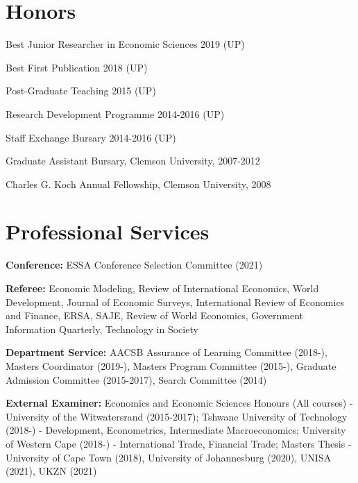 \documentclass[margin,line]{res}                          %
\newenvironment{list1}{
  \begin{list}{\ding{113}}{%
      \setlength{\itemsep}{0.4em}
      \setlength{\parsep}{0in} \setlength{\parskip}{0in}
      \setlength{\topsep}{0in} \setlength{\partopsep}{0in} 
      \setlength{\leftmargin}{0.17in}}}{\end{list}}
\begin{document}
\begin{resume}
\section{\sc Honors}
\begin{list1}
\item[] Best Junior Researcher in Economic Sciences 2019 (UP)
\item[] Best First Publication 2018 (UP)
\item[] Post-Graduate Teaching 2015 (UP)
\item[] Research Development Programme 2014-2016 (UP)
\item[] Staff Exchange Bursary 2014-2016 (UP)
\item[] Graduate Assistant Bursary, Clemson University, 2007-2012
\item[] Charles G. Koch Annual Fellowship, Clemson University, 2008
\end{list1}

\section{\sc Professional Services}
\begin{list1}
\item[] \textbf{Conference: } ESSA Conference Selection Committee (2021)
\item[] \textbf{Referee: }Economic Modeling, Review of International Economics, World Development, Journal of Economic Surveys, International Review of Economics and Finance, ERSA, SAJE, Review of World Economics, Government Information Quarterly, Technology in Society 
\item[] \textbf{Department Service: }AACSB Assurance of Learning Committee (2018-), Masters Coordinator (2019-), Masters Program Committee (2015-), Graduate Admission Committee (2015-2017), Search Committee (2014) 
\item[] \textbf{External Examiner: }Economics and Economic Sciences Honours (All courses) - University of the Witwatersrand (2015-2017); Tshwane University of Technology (2018-) - Development, Econometrics, Intermediate Macroeconomics; University of Western Cape (2018-) - International Trade, Financial Trade; Masters Thesis - University of Cape Town (2018), University of Johannesburg (2020), UNISA (2021), UKZN (2021)
\end{list1}


\end{resume}
\end{document}
